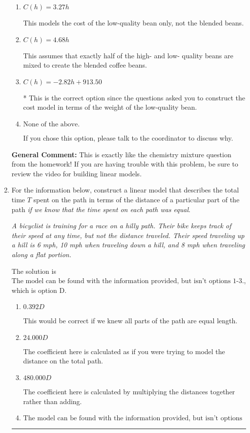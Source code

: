 \documentclass{extbook}[14pt]
\newcommand{\litem}[1]{\item #1

\rule{\textwidth}{0.4pt}}
\begin{document}
\begin{enumerate}
{\begin{enumerate}[label=\Alph*.]
This would be correct if the question asked you to construct the cost model in terms of the weight of the high-quality bean.
\item \( C(h) = 3.27 h \)

This models the cost of the low-quality bean only, not the blended beans.
\item \( C(h) = 4.68 h \)

This assumes that exactly half of the high- and low- quality beans are mixed to create the blended coffee beans.
\item \( C(h) = -2.82 h + 913.50 \)

* This is the correct option since the questions asked you to construct the cost model in terms of the weight of the low-quality bean.
\item \( \text{None of the above.} \)

If you chose this option, please talk to the coordinator to discuss why.
\end{enumerate}

\textbf{General Comment:} This is exactly like the chemistry mixture question from the homework! If you are having trouble with this problem, be sure to review the video for building linear models.
}
\litem{
For the information below, construct a linear model that describes the total time $T$ spent on the path in terms of the distance of a particular part of the path \textit{if we know that the time spent on each path was equal}.

\begin{center}
    \textit{ A bicyclist is training for a race on a hilly path. Their bike keeps track of their speed at any time, but not the distance traveled. Their speed traveling up a hill is 6 mph, 10 mph when traveling down a hill, and 8 mph when traveling along a flat portion. }
\end{center}
The solution is \( \text{The model can be found with the information provided, but isn't options 1-3.} \), which is option D.\begin{enumerate}[label=\Alph*.]
\item \( 0.392 D \)

This would be correct if we knew all parts of the path are equal length.
\item \( 24.000 D \)

The coefficient here is calculated as if you were trying to model the distance on the total path.
\item \( 480.000 D \)

The coefficient here is calculated by multiplying the distances together rather than adding.
\item \( \text{The model can be found with the information provided, but isn't options 1-3.} \)


\end{enumerate}}
\end{enumerate}
\end{document}
